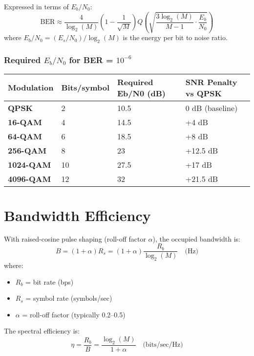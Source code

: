 Expressed in terms of $E_b/N_0$:
\begin{equation}
\text{BER} \approx \frac{4}{\log_2(M)}\left(1 - \frac{1}{\sqrt{M}}\right) Q\left(\sqrt{\frac{3\log_2(M)}{M-1} \cdot \frac{E_b}{N_0}}\right)
\label{eq:qam-ber-eb}
\end{equation}
where $E_b/N_0 = (E_s/N_0) / \log_2(M)$ is the energy per bit to noise ratio.

\subsubsection{Required $E_b/N_0$ for BER = $10^{-6}$}

{\def\LTcaptype{} %
\begin{longtable}[]{@{}llll@{}}
\toprule\noalign{}
Modulation & Bits/symbol & Required Eb/N0 (dB) & SNR Penalty vs QPSK \\
\midrule\noalign{}
\endhead
\bottomrule\noalign{}
\endlastfoot
\textbf{QPSK} & 2 & 10.5 & 0 dB (baseline) \\
\textbf{16-QAM} & 4 & 14.5 & +4 dB \\
\textbf{64-QAM} & 6 & 18.5 & +8 dB \\
\textbf{256-QAM} & 8 & 23 & +12.5 dB \\
\textbf{1024-QAM} & 10 & 27.5 & +17 dB \\
\textbf{4096-QAM} & 12 & 32 & +21.5 dB \\
\end{longtable}
}

\section{Bandwidth Efficiency}

With raised-cosine pulse shaping (roll-off factor $\alpha$), the occupied bandwidth is:
\begin{equation}
B = (1 + \alpha) R_s = (1 + \alpha) \frac{R_b}{\log_2(M)} \quad \text{(Hz)}
\label{eq:qam-bandwidth}
\end{equation}
where:
\begin{itemize}
\item $R_b$ = bit rate (bps)
\item $R_s$ = symbol rate (symbols/sec)
\item $\alpha$ = roll-off factor (typically 0.2--0.5)
\end{itemize}

The spectral efficiency is:
\begin{equation}
\eta = \frac{R_b}{B} = \frac{\log_2(M)}{1 + \alpha} \quad \text{(bits/sec/Hz)}
\label{eq:qam-spectral-efficiency}
\end{equation}


